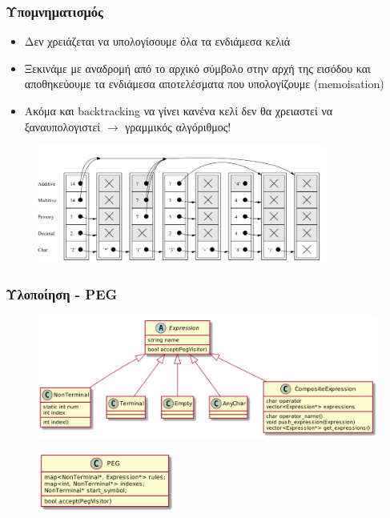 \documentclass{beamer}
\begin{document}
\begin{frame}
  \frametitle{Υπομνηματισμός}
  \begin{itemize}
	\item Δεν χρειάζεται να υπολογίσουμε όλα τα ενδιάμεσα κελιά
	\item Ξεκινάμε με αναδρομή από το αρχικό σύμβολο στην αρχή της εισόδου και αποθηκεύουμε τα ενδιάμεσα αποτελέσματα που υπολογίζουμε (memoisation) \pause
	\item Ακόμα και backtracking να γίνει κανένα κελί δεν θα χρειαστεί να ξαναυπολογιστεί $\rightarrow$ γραμμικός αλγόριθμος! \pause
  \end{itemize}

\begin{figure}[h]
    \centering
	\includegraphics[width=0.85\textwidth]{../transcript/pics/packrat_memo_example}
\end{figure}

\end{frame}

\begin{frame}
  \frametitle{Υλοποίηση - PEG}
\begin{figure}[h]
    \centering
	\includegraphics[width=1.05\textwidth]{../transcript/uml/peg_elements}
\end{figure} \pause
\begin{figure}[h]
    \centering
	\includegraphics[width=0.40\textwidth]{../transcript/uml/peg}
\end{figure}
\end{frame}
\end{document}
